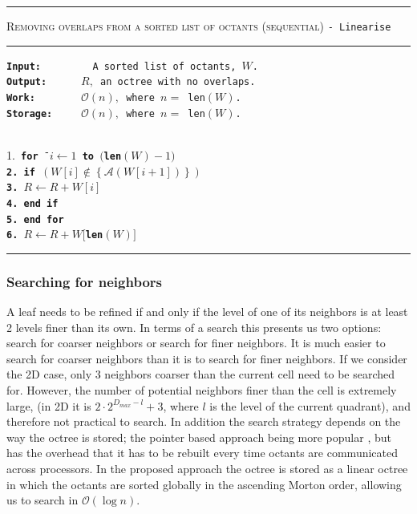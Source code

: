 \begin{table} 
\centering
\rule{\textwidth}{0.01mm}
\begin{algorithm}{ \textsc{Removing overlaps from a sorted list of octants (sequential)} \tt{- Linearise}}
\rule{\textwidth}{0.01mm}
\flushleft
\tt{\bf{Input:~~~~~~~~}} A sorted list of octants, $W$.\\
  \tt{\bf{Output:~~~~~}} $R,$ an octree with no overlaps.\\
  \tt{\bf{Work:~~~~~~~}} $\mathcal{O}(n),$ where $n = $ len$(W)$.\\
  \tt{\bf{Storage:~~~~}} $\mathcal{O}(n),$ where $n = $ len$(W)$.\\
~\\
\begin{tabbing}			
      1.\tt{ \bf{for}} \= $i \leftarrow 1$ \bf{to} \tt{$($len$(W)-1)$} \\
      2. \> \tt{\bf {if}} \= {$\left(W[i] \notin \left\{\mathcal{A}(W[i+1])\right\}\right)$}\\
      3. \> \> $R \leftarrow R + W[i]$\\
      4. \> \tt{\bf{end if}}\\
      5. \tt{\bf{end for}}\\
      6. $R \leftarrow R + W[$len$(W)]$
\end{tabbing}
\label{alg:linearise}
\end{algorithm}
\rule{\textwidth}{0.01mm}
\end{table}

\subsubsection{Searching for neighbors}
\label{sec:search}
A leaf needs to be refined if and only if the level of one of its neighbors is at least 2 levels finer than its own. In terms of a search this presents us two options: search for coarser neighbors or search for finer neighbors. It is much easier to search for coarser neighbors than it is to search for finer neighbors. If we consider the 2D case, only 3 neighbors coarser than the current cell need to be searched for. However, the number of potential neighbors finer than the cell is extremely large, (in 2D it is $2\cdot 2^{D_{max}-l}+3$, where $l$ is the level of the current quadrant), and therefore not practical to search. In addition the search strategy depends on the way the octree is stored; the pointer based approach being more popular \cite{ bern99, tu04a}, but has the overhead that it has to be rebuilt every time octants are communicated across processors. In the proposed approach the octree is stored as a linear octree in which the octants are sorted globally in the ascending Morton order, allowing us to search in $\mathcal{O}(\log n)$. 

